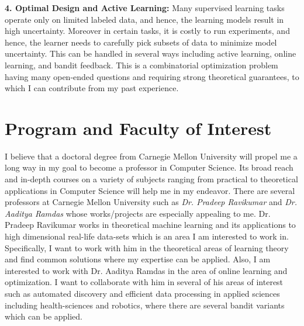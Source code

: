 \documentclass{article}
\begin{document}
\textbf{4. Optimal Design and Active Learning:} Many supervised learning tasks operate only on limited labeled data, and hence, the learning models result in high uncertainty. Moreover in certain tasks, it is costly to run experiments, and hence, the learner needs to carefully pick subsets of data to minimize model uncertainty. This can be handled
in several ways including active learning, online learning, and bandit feedback. This is a combinatorial optimization problem having many open-ended questions and requiring strong theoretical guarantees, to which I can contribute from my past experience.


\vspace*{-2em}
\section{Program and Faculty of Interest}
\vspace*{-1em}

I believe that a doctoral degree from Carnegie Mellon University will propel me a long way in my goal to become a professor in Computer Science. Its broad reach and in-depth courses on a  variety of subjects ranging from practical to theoretical applications in Computer Science will help me in my endeavor. There are several professors at Carnegie Mellon University such as \textit{Dr. Pradeep Ravikumar} and \textit{Dr. Aaditya Ramdas} whose works/projects are especially appealing to me. Dr. Pradeep Ravikumar works in theoretical machine learning and its applications to high dimensional real-life data-sets which is an area I am interested to work in. Specifically, I want to work with him in the theoretical areas of learning theory and find common solutions where my expertise can be applied. Also, I am interested to work with Dr. Aaditya Ramdas in the area of online learning and optimization. I want to collaborate with him in several of his areas of interest such as automated discovery and efficient data processing in applied sciences including health-sciences and robotics, where there are several bandit variants which can be applied.
\end{document}

